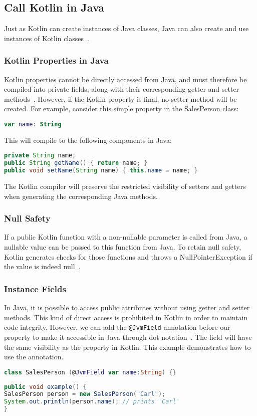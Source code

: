 \documentclass[a4paper,11pt]{article}
\begin{document}
\subsection{Call Kotlin in Java}
Just as Kotlin can create instances of Java classes, Java can also create and use instances of Kotlin classes~\cite{interop-java}.

\subsubsection{Kotlin Properties in Java}
Kotlin properties cannot be directly accessed from Java, and must therefore be compiled into private fields, along with their corresponding getter and setter methods~\cite{interop-properties}. However, if the Kotlin property is final, no setter method will be created. For example, consider this simple property in the SalesPerson class:
\begin{lstlisting}[language=Kotlin]
var name: String
\end{lstlisting}
This will compile to the following components in Java:
\begin{lstlisting}[language=Java]
private String name;
public String getName() { return name; }
public void setName(String name) { this.name = name; }
\end{lstlisting}
The Kotlin compiler will preserve the restricted visibility of setters and getters when generating the corresponding Java methods.

\subsubsection{Null Safety} %
If a public Kotlin function with a non-nullable parameter is called from Java, a nullable value can be passed to this function from Java. To retain null safety, Kotlin generates checks for those functions and throws a NullPointerException if the value is indeed null~\cite{interop-java-null-safety}.

\subsubsection{Instance Fields}
In Java, it is possible to access public attributes without using getter and setter methods. This kind of direct access is prohibited in Kotlin in order to maintain code integrity. However, we can add the \texttt{@JvmField} annotation before our property to make it accessible in Java through dot notation~\cite{interop-instance-fields}. The field will have the same visibility as the property in Kotlin.
This example demonstrates how to use the annotation.
\begin{lstlisting}[language=Kotlin]
class SalesPerson (@JvmField var name:String) {}
\end{lstlisting}
\begin{lstlisting}[language=Java]
public void example() {
SalesPerson person = new SalesPerson("Carl");
System.out.println(person.name); // prints 'Carl'
}
\end{lstlisting}
\end{document}
